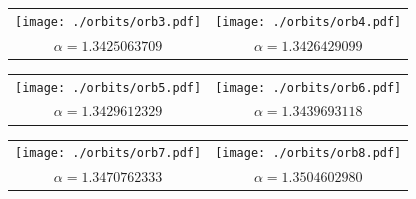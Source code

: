 \documentclass{article}
\begin{document}
\begin{tabular}{cc}
\texttt{[image: ./orbits/orb3.pdf]}&
\texttt{[image: ./orbits/orb4.pdf]}\\
$\alpha= 1.3425063709$&$ \alpha=1.3426429099 $
\end{tabular}

\begin{tabular}{cc}
\texttt{[image: ./orbits/orb5.pdf]}&
\texttt{[image: ./orbits/orb6.pdf]}\\
$\alpha=1.3429612329 $&$ \alpha=1.3439693118 $
\end{tabular}

\begin{tabular}{cc}
\texttt{[image: ./orbits/orb7.pdf]}&
\texttt{[image: ./orbits/orb8.pdf]}\\
$\alpha= 1.3470762333$&$ \alpha= 1.3504602980$
\end{tabular}
\end{document}
